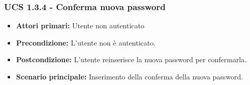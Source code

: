\subsubsection{UCS 1.3.4 - Conferma nuova password}
\begin{itemize}
\item \textbf{Attori primari:} Utente non autenticato
\item \textbf{Precondizione:} L'utente non è autenticato.
\item \textbf{Postcondizione:} L'utente reinserisce la nuova password per confermarla.
\item \textbf{Scenario principale:} Inserimento della conferma della nuova password.
\end{itemize}
